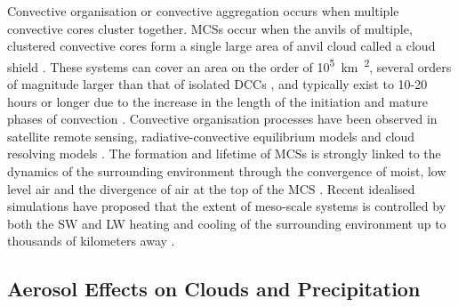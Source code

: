 Convective organisation or convective aggregation occurs when multiple convective cores cluster together. MCSs occur when the anvils of multiple, clustered convective cores form a single large area of anvil cloud called a cloud shield \citep{roca_simple_2017}. 
These systems can cover an area on the order of 10\textsuperscript{5}\SI{}{\kilo\meter\textsuperscript{2}}, several orders of magnitude larger than that of isolated DCCs \citep{houze_mesoscale_2004}, and typically exist to 10-20 hours or longer \citep{chen_diurnal_1997} due to the increase in the length of the initiation and mature phases of convection \citep{wall_life_2018}.
Convective organisation processes have been observed in satellite remote sensing, radiative-convective equilibrium models and cloud resolving models \citep{holloway_observing_2017}. 
The formation and lifetime of MCSs is strongly linked to the dynamics of the surrounding environment through the convergence of moist, low level air and the divergence of air at the top of the MCS \citep{houze_chapter_2014}. 
Recent idealised simulations have proposed that the extent of meso-scale systems is controlled by both the SW and LW heating and cooling of the surrounding environment up to thousands of kilometers away \citep{beucler_budget_2019}. 



\subsection{Aerosol Effects on Clouds and Precipitation}

